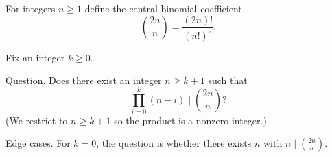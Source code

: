 For integers $n\ge 1$ define the central binomial coefficient
\[
\binom{2n}{n}=\frac{(2n)!}{(n!)^2}.
\]

Fix an integer $k\ge 0$.

Question.
Does there exist an integer $n\ge k+1$ such that
\[
\prod_{i=0}^{k} (n-i) \mid \binom{2n}{n}?
\]
(We restrict to $n\ge k+1$ so the product is a nonzero integer.)

Edge cases.
For $k=0$, the question is whether there exists $n$ with $n\mid\binom{2n}{n}$.
